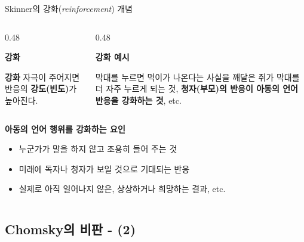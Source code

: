 \documentclass[aspectratio=169]{beamer}
\begin{document}
\begin{frame}[t]{Skinner의 강화(\textit{reinforcement}) 개념}
    \vspace{1cm}
  \begin{columns}[T,onlytextwidth]
    \begin{column}[t]{0.48\textwidth}
      \begin{minipage}[t][3cm][t]{\linewidth}
        \textbf{강화}
        
        \medskip
        \textbf{강화} 자극이 주어지면 반응의 \textbf{강도(빈도)}가 높아진다. 
      \end{minipage}
    \end{column}

    \begin{column}[t]{0.48\textwidth}
      \begin{minipage}[t][3cm][t]{\linewidth}
        \textbf{강화 예시}
        
        \medskip
        막대를 누르면 먹이가 나온다는 사실을 깨달은 쥐가 막대를 더 자주 누르게 되는 것, \textbf{청자(부모)의 반응이 아동의 언어 반응을 강화하는 것}, etc. 
      \end{minipage}
    \end{column}
  \end{columns}

  \vspace{0.6em}

  \begin{columns}[T,onlytextwidth]
    \begin{column}{\textwidth}
      \textbf{아동의 언어 행위를 강화하는 요인}
      
      \medskip
      \begin{itemize}
        \item 누군가가 말을 하지 않고 조용히 들어 주는 것
        \item 미래에 독자나 청자가 보일 것으로 기대되는 반응
        \item 실제로 아직 일어나지 않은, 상상하거나 희망하는 결과, etc.  
      \end{itemize} 
    \end{column}
  \end{columns}
\end{frame}

\subsection{Chomsky의 비판 - (2)}
\end{document}
